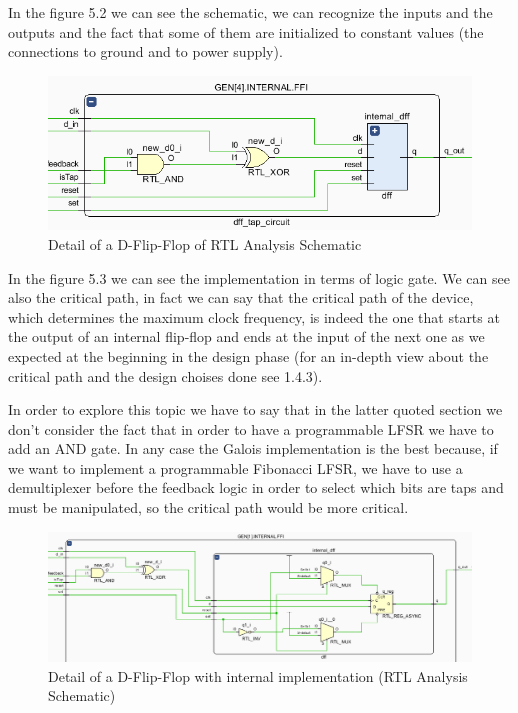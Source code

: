 \documentclass[a4paper]{report}
\begin{document}
\noindent In the figure 5.2 we can see the schematic, we can recognize the inputs and the outputs and the fact that some of them are initialized to constant values (the connections to ground and to power supply).

\begin{figure}[htpb]
	\centering
	\includegraphics[scale=0.7]{img/vivado/detail_of_rtl_analysis.png}
	\caption{Detail of a D-Flip-Flop of RTL Analysis Schematic}
\end{figure}

\noindent In the figure 5.3 we can see the implementation in terms of logic gate. We can see also the critical path, in fact we can say that the critical path of the device, which determines the maximum clock frequency, is indeed the one that starts at the output of an internal flip-flop and ends at the input of the next one as we expected at the beginning in the design phase (for an in-depth view about the critical path and the design choises done see 1.4.3).

\noindent In order to explore this topic we have to say that in the latter quoted section we don't consider the fact that in order to have a programmable LFSR we have to add an AND gate. In any case the Galois implementation is the best because, if we want to implement a programmable Fibonacci LFSR, we have to use a demultiplexer before the feedback logic in order to select which bits are taps and must be manipulated, so the critical path would be more critical.

\begin{figure}[htpb]
	\centering
	\includegraphics[scale=0.55]{img/vivado/detail_of_detail_of_rtl_analysis.png}
	\caption{Detail of a D-Flip-Flop with internal implementation (RTL Analysis Schematic)}
\end{figure}
\end{document}
